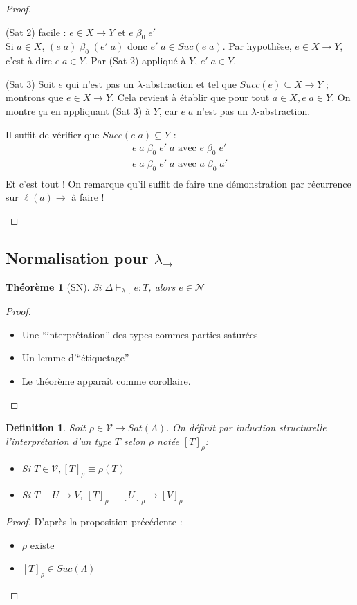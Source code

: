 \documentclass{article}
\newtheorem{thm}{Théorème}
\newtheorem{defi}{Definition}
\newcommand\tlambda[0]{$\lambda$}
\begin{document}
\begin{proof}
\begin{enumerate}[noitemsep,label=\roman*)]
(Sat 2) facile : $e\in X\to Y$ et $e\; \beta_0\; e'$\\
Si $a \in X$, $(e\; a)\; \beta_0\;(e'\; a)$ donc $e'\; a \in Suc(e\; a)$. Par hypothèse, $e\in X \to Y$, c'est-à-dire $e\; a \in Y$. Par (Sat 2) appliqué à $Y$, $e'\; a\in Y$.
\smallskip

(Sat 3) Soit $e$ qui n'est pas un \tlambda-abstraction et tel que $Succ(e)\subseteq X \to Y$ ; montrons que $e\in X \to Y$. Cela revient à établir que pour tout $a\in X, e\; a \in Y$. On montre ça en appliquant (Sat 3) à $Y$, car $e\; a$ n'est pas un \tlambda-abstraction.

Il suffit de vérifier que $Succ(e\; a)\subseteq Y$ :
\begin{align*}
e \; a \; \beta_0\; e' \; a \text{ avec } e\; \beta_0 \; e'\\
e \; a \; \beta_0\; e' \; a \text{ avec } a\; \beta_0 \; a'\\
\end{align*}
Et c'est tout !
On remarque qu'il suffit de faire une démonstration par récurrence sur $\ell (a)\to$ à faire !
\end{enumerate}
\end{proof}

\subsection{Normalisation pour $\lambda_\to$}
\begin{thm}[SN]
Si $\Delta \vdash_{\lambda_\to} e:T$, alors $e\in \mathcal{N}$
\end{thm}
\begin{proof}
\begin{itemize}[noitemsep,label=*]
\item Une ``interprétation'' des types commes parties saturées
\item Un lemme d'``étiquetage''
\item Le théorème apparaît comme corollaire.
\end{itemize}
\end{proof}

\begin{defi}
Soit $\rho \in \mathcal{V}\to Sat(\Lambda)$. On définit par induction structurelle l'interprétation d'un type $T$ selon $\rho$ notée $[T]_\rho$:
\begin{itemize}[label=*]
\item Si $T\in \mathcal{V}, [T]_\rho \equiv \rho(T)$
\item Si $T\equiv U\to V$, $[T]_\rho \equiv [U]_\rho \to [V]_\rho$
\end{itemize}
\end{defi}
\begin{proof}
D'après la proposition précédente :
\begin{itemize}[noitemsep,label=-]
\item $\rho$ existe
\item $[T]_\rho \in Suc(\Lambda)$
\end{itemize}
\end{proof}
\end{document}
